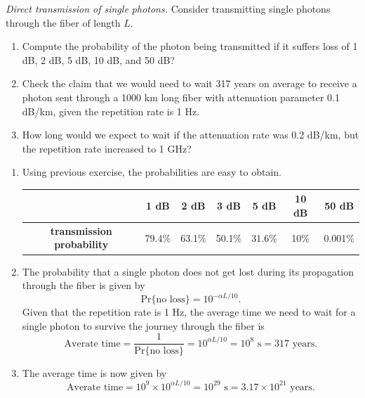 \begin{exercise}
\emph{Direct transmission of single photons.} Consider transmitting single photons through the fiber of length $L$.
\begin{enumerate}
    \item Compute the probability of the photon being transmitted if it suffers loss of 1 dB, 2 dB, 5 dB, 10 dB, and 50 dB?
    \item Check the claim that we would need to wait 317 years on average to receive a photon sent through a 1000 km long fiber with attenuation parameter 0.1 dB/km, given the repetition rate is 1 Hz.
    \item How long would we expect to wait if the attenuation rate was 0.2 dB/km, but the repetition rate increased to 1 GHz?
\end{enumerate}
\end{exercise}
\begin{solution}
\begin{enumerate}[label=(\alph*)]
    \item Using previous exercise, the probabilities are easy to obtain.
    \begin{table}[h]
    \setcellgapes{3pt}
    \renewcommand\theadfont{}
    \makegapedcells
    \centering
    \begin{tabular}{ccccccc}
        \hline
        & \textbf{1 dB} & \textbf{2 dB} & \textbf{3 dB} & \textbf{5 dB} & \textbf{10 dB} & \textbf{50 dB} \\
        \hline
        \textbf{transmission probability} & 79.4\% & 63.1\% & 50.1\% & 31.6\% & 10\% & 0.001\% \\
        \hline
    \end{tabular}
    \end{table}
    \item The probability that a single photon does not get lost during its propagation through the fiber is given by
    \begin{equation*}
        \text{Pr}\{\text{no loss}\} = 10^{-\alpha L/10}.
    \end{equation*}
    Given that the repetition rate is 1 Hz, the average time we need to wait for a single photon to survive the journey through the fiber is
    \begin{equation*}
        \text{Averate time} = \frac{1}{\text{Pr}\{\text{no loss}\}} = 10^{\alpha L/10} = 10^8 \text{ s} = 317 \text{ years}.
    \end{equation*}
    \item The average time is now given by
    \begin{equation*}
        \text{Averate time} = 10^9 \times 10^{\alpha L/10} = 10^{29} \text{ s} = 3.17 \times 10^{21} {\text{ years}}.
    \end{equation*}
\end{enumerate}
\end{solution}

